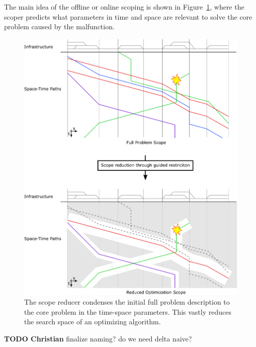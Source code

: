 \documentclass{article}
\begin{document}
The main idea of the offline or online scoping is shown in Figure~\ref{fig:introduction_time_space}, where the scoper predicts what parameters in time and space are relevant to solve the core problem caused by the malfunction.

%
\begin{figure}[hbtp]
	\centering
  \includegraphics[width=\textwidth]{Figures/rsp_rescheduling_rsp.pdf}
	\caption{The scope reducer condenses the initial full problem description to the core problem in the time-space parameters. This vastly reduces the search space of an optimizing algorithm.}
	\label{fig:introduction_time_space}
\end{figure}

\begin{mdframed}
{\bf TODO Christian} finalize naming? do we need delta naive?
\end{mdframed}
\end{document}
